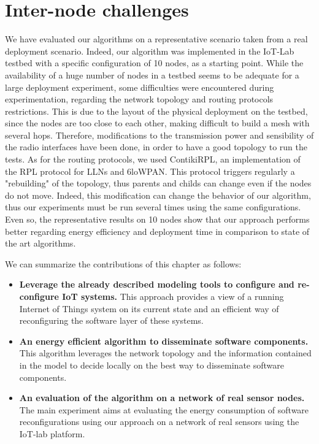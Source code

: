 \section{Inter-node challenges}
We have evaluated our algorithms on a representative scenario taken from a real deployment scenario.
Indeed, our algorithm was implemented in the IoT-Lab testbed \cite{Fleury15iotlab} with a specific configuration of 10 nodes, as a starting point.
While the availability of a huge number of nodes in a testbed seems to be adequate for a large deployment experiment, some difficulties were encountered during experimentation, regarding the network topology and routing protocols restrictions.
This is due to the layout of the physical deployment on the testbed, since the nodes are too close to each other, making difficult to build a mesh with several hops.
Therefore, modifications to the transmission power and sensibility of the radio interfaces have been done, in order to have a good topology to run the tests.
As for the routing protocols, we used ContikiRPL\cite{tsiftes2010contikirpl}, an implementation of the RPL\cite{rfc6550} protocol for LLNs and 6loWPAN.
This protocol triggers regularly a "rebuilding" of the topology, thus parents and childs can change even if the nodes do not move.
Indeed, this modification can change the behavior of our algorithm, thus our experiments must be run several times using the same configurations.
Even so, the representative results on 10 nodes show that our approach performs better regarding energy efficiency and deployment time in comparison to state of the art algorithms.

We can summarize the contributions of this chapter as follows:
\begin{itemize}
	\item \textbf{Leverage the already described modeling tools to configure and re-configure IoT systems.} This approach provides a view of a running Internet of Things system on its current state and an efficient way of reconfiguring the software layer of these systems.
	\item \textbf{An energy efficient algorithm to disseminate software components.} This algorithm leverages the network topology and the information contained in the model to decide locally on the best way to disseminate software components.
	\item \textbf{An evaluation of the algorithm on a network of real sensor nodes.} The main experiment aims at evaluating the energy consumption of software reconfigurations using our approach on a network of real sensors using the IoT-lab platform.
\end{itemize}


